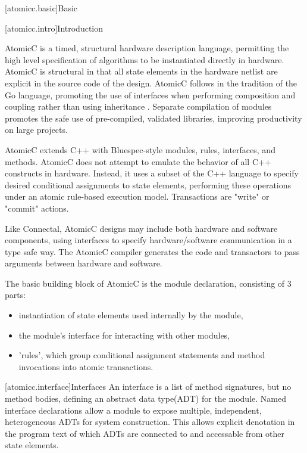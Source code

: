 [atomicc.basic]{Basic}

[atomicc.intro]{Introduction}

AtomicC is a timed, structural hardware description language, permitting
the high level specification of algorithms to be instantiated
directly in hardware.
AtomicC is structural in that all state elements in the hardware
netlist are explicit in the source code of the design.
AtomicC follows in the tradition of the Go language,
promoting the use of interfaces when performing composition and
coupling rather than using inheritance \cite{Pike2012}.
Separate compilation of modules promotes the safe use of pre-compiled, validated
libraries, improving productivity on large projects.

AtomicC extends C++
with Bluespec-style\cite{Bluespec:www,Hoe:Thesis,HoeArvind:TRS_Synthesis2}
modules, rules, interfaces, and methods.
AtomicC does not attempt to emulate the behavior of all C++ constructs in hardware.
Instead, it uses a subset of the C++ language to specify desired
conditional assignments to state elements,
performing these operations under an atomic rule-based execution model.
Transactions are "write" or "commit" actions.

Like Connectal, AtomicC designs may include both hardware and
software components, using interfaces to specify hardware/software communication
in a type safe way. The AtomicC compiler generates the code and transactors to pass
arguments between hardware and software.

The basic building block of AtomicC is the module declaration,
consisting of 3 parts:
\begin{itemize}
\item instantiation of state elements used internally by the module,
\item the module's interface for interacting with other modules,
\item 'rules', which group conditional assignment statements and method invocations into atomic transactions.
\end{itemize}

[atomicc.interface]{Interfaces}
An interface is a list of method signatures, but no method bodies, defining
an abstract data type(ADT) \cite{Liskov74programmingwith} for the module.
Named interface declarations allow a module to expose
multiple, independent, heterogeneous ADTs for system construction.
This allows explicit denotation in the program text
of which ADTs are connected to and accessable from other state elements.

